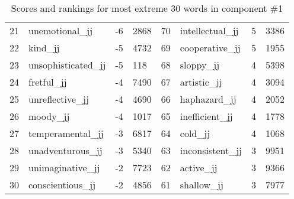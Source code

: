 \begin{table}[tbp]
\begin{tabular}{| rlr@{.}l | rlr@{.}l |}
    21 & unemotional\_jj & -6 & 2868    &    70 & intellectual\_jj & 5 & 3386 \\
    22 & kind\_jj & -5 & 4732    &    69 & cooperative\_jj & 5 & 1955 \\
    23 & unsophisticated\_jj & -5 & 118    &    68 & sloppy\_jj & 4 & 5398 \\
    24 & fretful\_jj & -4 & 7490    &    67 & artistic\_jj & 4 & 3094 \\
    25 & unreflective\_jj & -4 & 4690    &    66 & haphazard\_jj & 4 & 2052 \\
    26 & moody\_jj & -4 & 1017    &    65 & inefficient\_jj & 4 & 1778 \\
    27 & temperamental\_jj & -3 & 6817    &    64 & cold\_jj & 4 & 1068 \\
    28 & unadventurous\_jj & -3 & 5340    &    63 & inconsistent\_jj & 3 & 9951 \\
    29 & unimaginative\_jj & -2 & 7723    &    62 & active\_jj & 3 & 9366 \\
    30 & conscientious\_jj & -2 & 4856    &    61 & shallow\_jj & 3 & 7977 \\
    \hline
    \end{tabular}
    \caption{Scores and rankings for most extreme 30 words in component \#1} 
\end{table}
\clearpage
